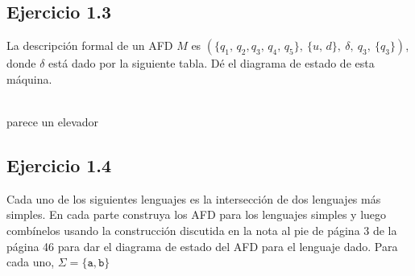 \documentclass{article}
\begin{document}
\newpage

\subsection*{Ejercicio 1.3}
La descripción formal de un AFD $M$ es $(\{q_1,\,q_2,q_3,\,q_4,\,q_5\},\ \{u,\,d\},\ \delta,\ q_3,\ \{q_3\})$, donde $\delta$ está dado por la siguiente tabla. Dé el diagrama de estado de esta máquina.
\begin{center}
    
    \\
    {\scriptsize parece un elevador}
\end{center}

\newpage

\subsection*{Ejercicio 1.4}
Cada uno de los siguientes lenguajes es la intersección de dos lenguajes más simples. En cada parte construya los AFD para los lenguajes simples y luego combínelos usando la construcción discutida en la nota al pie de página 3 de la página 46 para dar el diagrama de estado del AFD para el lenguaje dado. Para cada uno, $\Sigma=\{\texttt{a},\texttt{b}\}$
\end{document}
